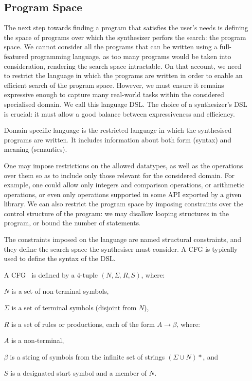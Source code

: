 \subsection{Program Space} \label{sec:program-space}
The next step towards finding a program that satisfies the user's needs is defining the space of programs over which the synthesizer perfors the search: the program space.
We cannot consider all the programs that can be written using a full-featured programming language, as too many programs would be taken into consideration, rendering the search space intractable.
On that account, we need to restrict the language in which the programs are written in order to enable an efficient search of the program space.
However, we must ensure it remains expressive enough to capture many real-world tasks within the considered specialised domain.
We call this language \acf{DSL}.
The choice of a synthesizer's \ac{DSL} is crucial: it must allow a good balance between expressiveness and efficiency.

\begin{definition}
Domain specific language is the restricted language in which the synthesised programs are written. It includes information about both form (syntax) and meaning (semantics).
\end{definition}


One may impose restrictions on the allowed datatypes, as well as the operations over them so as to include only those relevant for the considered domain. For example, one could allow only integers and comparison operations, or arithmetic operations, or even only operations supported in some API exported by a given library. We can also restrict the program space by imposing constraints over the control structure of the program: we may disallow looping structures in the program, or bound the number of statements.

The constraints imposed on the language are named structural constraints, and they define the search space the synthesiser must consider. A \ac{CFG} is typically used to define the syntax of the \ac{DSL}.

\begin{definition}
A \acl{CFG}~\cite{Jurafsky} is defined by a 4-tuple \((N, \Sigma, R, S)\), where:

\(N\) is a set of non-terminal symbols,

\(\Sigma\) is a set of terminal symbols (disjoint from \(N\)),

\(R\) is a set of rules or productions, each of the form \(A \to \beta\), where:

\quad \(A\) is a non-terminal,

\quad \(\beta\) is a string of symbols from the infinite set of strings \((\Sigma \cup N)*\), and

\(S\) is a designated start symbol and a member of \(N\).
\end{definition}


